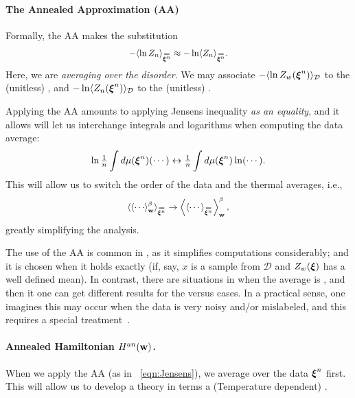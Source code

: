 \paragraph{The Annealed Approximation (AA)} 
Formally, the AA makes the substitution
\begin{align}
\label{eqn:AA}
-\langle\ln Z_{n}\rangle_{\AVGNDXIn}\approx-\ln \langle Z_{n}\rangle_{\AVGNDXIn}.
\end{align}
Here, we are \emph{averaging over the disorder}.
We may associate $-\langle\ln Z_w(\boldsymbol{\xi}^{n})\rangle_{\mathcal{D}}$ to the (unitless) \Quenched \FreeEnergy, and
$-\ln \langle Z_{n}(\boldsymbol{\xi}^{n})\rangle_{\mathcal{D}}$ to the (unitless) \Annealed \FreeEnergy.

Applying the AA amounts to applying Jensens inequality \emph{as an equality}, 
and it allows will let us interchange integrals and logarithms when computing the data average:
\begin{align}
\label{eqn:Jensens}
\ln\tfrac{1}{n}\int d\mu(\boldsymbol{\xi}^{n})(\cdots)\leftrightarrow \tfrac{1}{n}\int d\mu(\boldsymbol{\xi}^{n})\ln(\cdots)   .
\end{align}
This will allow us to switch the order of the data and the thermal averages, i.e.,
\begin{align}
 \label{eqn:switch}
\langle\THRMAVGw{\cdots}\rangle_{\AVGNDXIn}\rightarrow\THRMAVGw{\langle\cdots\rangle_{\AVGNDXIn}}   ,
\end{align}
greatly simplifying the analysis.

The use of the AA is common in \STATMECH, as it simplifies computations considerably; and 
it is chosen when it holds exactly (if, say, $x$ is a \Typical sample from $\mathcal{D}$ and $Z_w(\boldsymbol{\xi})$ has a well defined mean).
In contrast, there are situations in \STATMECH when the average is \ATypical, and then it one can get different results for the \Quenched versus \Annealed cases.  In a practical sense, one imagines this may occur when the data is very
noisy and/or mislabeled, and this requires a special treatment~\cite{SST92}.

\paragraph{Annealed Hamiltonian $H^{an}({\mathbf{w}})$.}

When we apply the AA (as in \EQN~\ref{eqn:Jensens}), 
we average over the data $\boldsymbol{\xi}^{n}$ first. 
This will allow us to develop a theory in terms a (Temperature dependent) \EffectivePotential. 
%

